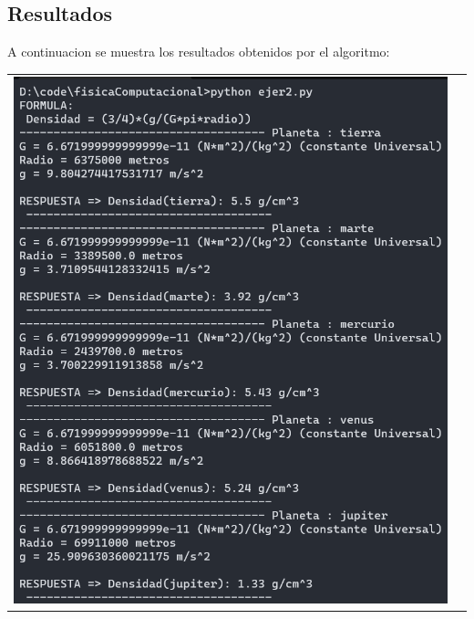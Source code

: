 \documentclass[a4paper,12pt]{article}
\begin{document}
    \subsection{Resultados}
    A continuacion se muestra los resultados obtenidos por el algoritmo:

    \begin{table}[htbp]
        \centering
        \begin{tabular}{cc}
            \begin{minipage}{.3\textwidth}
                \includegraphics[width=\linewidth]{e2_1}
            \end{minipage}&
            \begin{minipage}{.3\textwidth}

\end{minipage}
\end{tabular}
\end{table}
\end{document}
